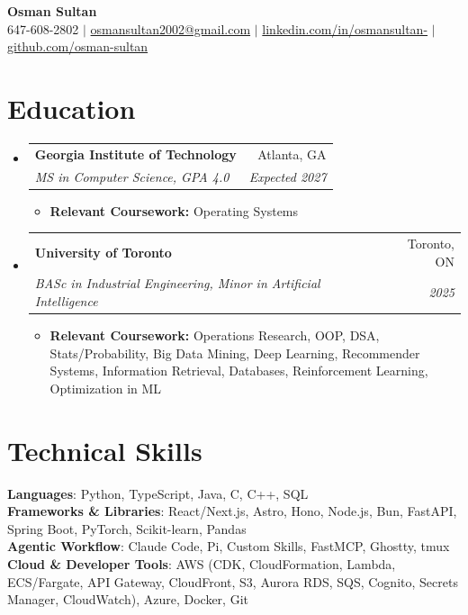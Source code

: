 \documentclass[letterpaper,11pt]{article}
\makeatletter
\newcommand{\resumeItem}[1]{
  \item\small{
    {#1\vspace{-4pt}}
  }
}
\newcommand{\resumeSubheading}[4]{
  \vspace{-2pt}\item
    \begin{tabular*}{0.97\textwidth}[t]{l@{\extracolsep{\fill}}r}
      \textbf{#1} & #2 \\
      \textit{\small#3} & \textit{\small #4} \\
    \end{tabular*}\vspace{-10pt}
}
\newcommand{\resumeSubHeadingListStart}{\begin{itemize}[leftmargin=0.15in, label={}]}{}
\newcommand{\resumeSubHeadingListEnd}{\end{itemize}}
\newcommand{\resumeItemListStart}{\begin{itemize}}
\newcommand{\resumeItemListEnd}{\end{itemize}\vspace{-5pt}}
\makeatother
\begin{document}
\begin{center}
    \textbf{\LARGE Osman Sultan} \\
    \vspace{1pt}
    \small{647-608-2802} $|$
    {\href{mailto:osmansultan2002@gmail.com}{osmansultan2002@gmail.com}} $|$
    \href{https://linkedin.com/in/osmansultan-}{linkedin.com/in/osmansultan-} $|$
    \href{https://github.com/osman-sultan}{github.com/osman-sultan} %
\end{center}

\vspace{-12pt}
\section{Education}
    \resumeSubHeadingListStart
        \resumeSubheading
            {Georgia Institute of Technology}{Atlanta, GA}
            {MS in Computer Science, GPA 4.0} {Expected 2027}
        \resumeItemListStart
            \resumeItem{\textbf{Relevant Coursework:} Operating Systems}
        \resumeItemListEnd
        \resumeSubheading
            {University of Toronto}{Toronto, ON}
            {BASc in Industrial Engineering, Minor in Artificial Intelligence} {2025}
        \resumeItemListStart
            \resumeItem{\textbf{Relevant Coursework:} Operations Research, OOP, DSA, Stats/Probability, Big Data Mining, Deep Learning, Recommender Systems, Information Retrieval, Databases, Reinforcement Learning, Optimization in ML}
        \resumeItemListEnd
    \resumeSubHeadingListEnd

\section{Technical Skills}
 \begin{itemize}[leftmargin=0.15in, label={}]
    \small{\item{
     \textbf{Languages}{: Python, TypeScript, Java, C, C++, SQL} \\
     \textbf{Frameworks \& Libraries}{: React/Next.js, Astro, Hono, Node.js, Bun, FastAPI, Spring Boot, PyTorch, Scikit-learn, Pandas} \\
     \textbf{Agentic Workflow}{: Claude Code, Pi, Custom Skills, FastMCP, Ghostty, tmux} \\
     \textbf{Cloud \& Developer Tools}{: AWS (CDK, CloudFormation, Lambda, ECS/Fargate, API Gateway, CloudFront, S3, Aurora RDS, SQS, Cognito, Secrets Manager, CloudWatch), Azure, Docker, Git}
    }}
 \end{itemize}
\end{document}
